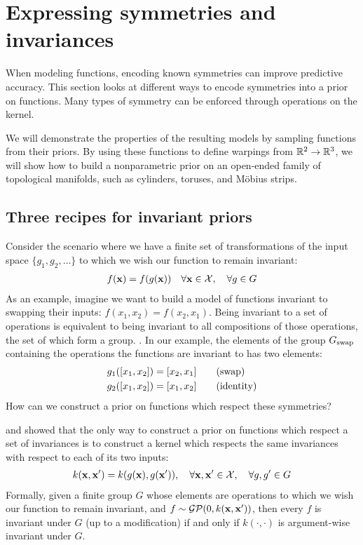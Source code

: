 \section{Expressing symmetries and invariances}
\label{sec:expressing-symmetries}

\def\gswitch{G_\textnormal{swap}}

When modeling functions, encoding known symmetries can improve predictive accuracy. 
This section looks at different ways to encode symmetries into a prior on functions.
Many types of symmetry can be enforced through operations on the kernel.

We will demonstrate the properties of the resulting models by sampling functions from their priors.
By using these functions to define warpings from $\mathbb{R}^2 \to \mathbb{R}^3$, we will show how to build a nonparametric prior on an open-ended family of topological manifolds, such as cylinders, toruses, and M\"{o}bius strips.

\subsection{Three recipes for invariant priors}

Consider the scenario where we have a finite set of transformations of the input space $\{g_1, g_2, \ldots \}$ to which we wish our function to remain invariant:
%
\begin{align}
f({\bf{x}}) = f(g({\bf{x}}))  \quad \forall {\bf{x}} \in \mathcal{X}, \quad \forall g \in G
\end{align}
%
As an example, imagine we want to build a model of functions invariant to swapping their inputs: $f(x_1, x_2) = f(x_2, x_1)$.
Being invariant to a set of operations is equivalent to being invariant to all compositions of those operations, the set of which form a group. \citep[chapter 21]{armstrong1988groups}.
In our example, the elements of the group $\gswitch$ containing the operations the functions are invariant to has two elements:%
%
\begin{align}
g_1([x_1, x_2]) & = [x_2, x_1] \qquad \textnormal{(swap)} \\
g_2([x_1, x_2]) & = [x_1, x_2] \qquad \textnormal{(identity)}
\end{align}
%
How can we construct a prior on functions which respect these symmetries?

\citet{ginsbourger2012argumentwise} and \citet{Invariances13} showed that the only way to construct a \gp{} prior on functions which respect a set of invariances is to construct a kernel which respects the same invariances with respect to each of its two inputs:
%
\begin{align}
k({\bf{x}}, {\bf{x}}') = k( g({\bf{x}}), g({\bf{x}}')), \quad \forall {\bf{x}}, {\bf{x}}' \in \mathcal{X}, \quad \forall g, g' \in G
\end{align}
%
Formally, given a finite group $G$ whose elements are operations to which we wish our function to remain invariant, and $f \sim \mathcal{GP}\!\left(0,k({\bf{x}},{\bf{x}}')\right)$, then every $f$ is invariant under $G$ (up to a modification) if and only if $k(\cdot, \cdot)$ is argument-wise invariant under $G$.

